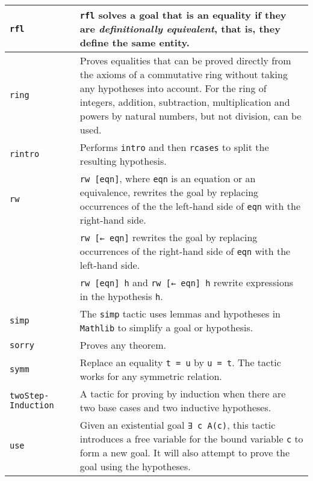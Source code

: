 \begin{tabular}{p{}|r|p{}}
\hline

\Verb+rfl+&\pageref{p.rfl}&\Verb+rfl+ solves a goal that is an equality if they are \emph{definitionally equivalent}, that is, they define the same entity.\\\hline

\Verb+ring+&\pageref{p.ring}&Proves equalities that can be proved directly from the axioms of a commutative ring without taking any hypotheses into account. For the ring of integers, addition, subtraction, multiplication and powers by natural numbers, but not division, can be used.\\\hline

\Verb+rintro+&\pageref{p.rintro}&Performs \Verb+intro+ and then \Verb+rcases+ to split the resulting hypothesis.\\\hline

\Verb+rw+&\pageref{p.rw}&\Verb+rw [eqn]+, where \Verb+eqn+ is an equation or an equivalence, rewrites the goal by replacing occurrences of the the left-hand side of \Verb+eqn+ with the right-hand side.\\
&&\Verb+rw [← eqn]+ rewrites the goal by replacing occurrences of the right-hand side of \Verb+eqn+ with the left-hand side.\\
&&\Verb+rw [eqn] h+ and \Verb+rw [← eqn] h+ rewrite expressions in the hypothesis \Verb+h+.\\\hline

\Verb+simp+&\pageref{p.simp}&The \Verb+simp+ tactic uses lemmas and hypotheses in \Verb+Mathlib+ to simplify a goal or hypothesis.\\\hline

\Verb+sorry+&\pageref{p.sorry}&Proves any theorem.\\\hline

\Verb+symm+&\pageref{p.symm}&Replace an equality \Verb+t = u+ by \Verb+u = t+. The tactic works for any symmetric relation.\\\hline

\Verb+twoStep-+ \Verb+Induction+&\pageref{p.two-step}&A tactic for proving by induction when there are two base cases and two inductive hypotheses.\\\hline

\Verb+use+&\pageref{p.use}&Given an existential goal \Verb+∃ c A(c)+, this tactic introduces a free variable for the bound variable \Verb+c+ to form a new goal. It will also attempt to prove the goal using the hypotheses.\\\hline

\end{tabular}

